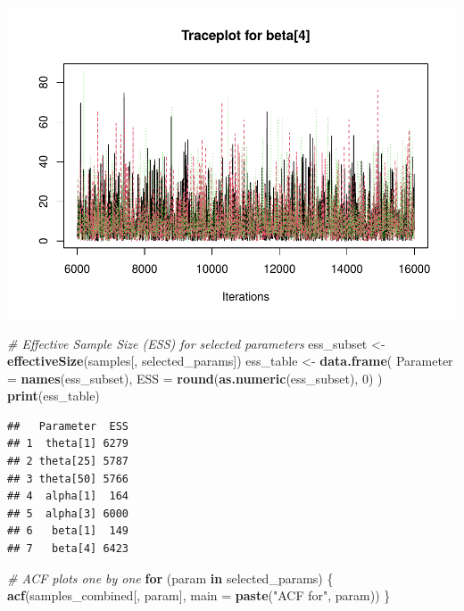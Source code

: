 \documentclass[
  11pt,
]{article}
\newenvironment{Shaded}{\begin{snugshade}}{\end{snugshade}}
\newcommand{\AttributeTok}[1]{\textcolor[rgb]{0.13,0.29,0.53}{#1}}
\newcommand{\CommentTok}[1]{\textcolor[rgb]{0.56,0.35,0.01}{\textit{#1}}}
\newcommand{\ControlFlowTok}[1]{\textcolor[rgb]{0.13,0.29,0.53}{\textbf{#1}}}
\newcommand{\DecValTok}[1]{\textcolor[rgb]{0.00,0.00,0.81}{#1}}
\newcommand{\FunctionTok}[1]{\textcolor[rgb]{0.13,0.29,0.53}{\textbf{#1}}}
\newcommand{\NormalTok}[1]{#1}
\newcommand{\OtherTok}[1]{\textcolor[rgb]{0.56,0.35,0.01}{#1}}
\newcommand{\StringTok}[1]{\textcolor[rgb]{0.31,0.60,0.02}{#1}}
\begin{document}
\includegraphics{Final-Project_files/figure-latex/appendix-code-2-7.pdf}

\begin{Shaded}
\begin{Highlighting}[]
\CommentTok{\# Effective Sample Size (ESS) for selected parameters}
\NormalTok{ess\_subset }\OtherTok{\textless{}{-}} \FunctionTok{effectiveSize}\NormalTok{(samples[, selected\_params])}
\NormalTok{ess\_table }\OtherTok{\textless{}{-}} \FunctionTok{data.frame}\NormalTok{(}
  \AttributeTok{Parameter =} \FunctionTok{names}\NormalTok{(ess\_subset),}
  \AttributeTok{ESS =} \FunctionTok{round}\NormalTok{(}\FunctionTok{as.numeric}\NormalTok{(ess\_subset), }\DecValTok{0}\NormalTok{)}
\NormalTok{)}
\FunctionTok{print}\NormalTok{(ess\_table)}
\end{Highlighting}
\end{Shaded}

\begin{verbatim}
##   Parameter  ESS
## 1  theta[1] 6279
## 2 theta[25] 5787
## 3 theta[50] 5766
## 4  alpha[1]  164
## 5  alpha[3] 6000
## 6   beta[1]  149
## 7   beta[4] 6423
\end{verbatim}

\begin{Shaded}
\begin{Highlighting}[]
\CommentTok{\# ACF plots one by one}
\ControlFlowTok{for}\NormalTok{ (param }\ControlFlowTok{in}\NormalTok{ selected\_params) \{}
  \FunctionTok{acf}\NormalTok{(samples\_combined[, param], }\AttributeTok{main =} \FunctionTok{paste}\NormalTok{(}\StringTok{"ACF for"}\NormalTok{, param))}
\NormalTok{\}}
\end{Highlighting}
\end{Shaded}
\end{document}
